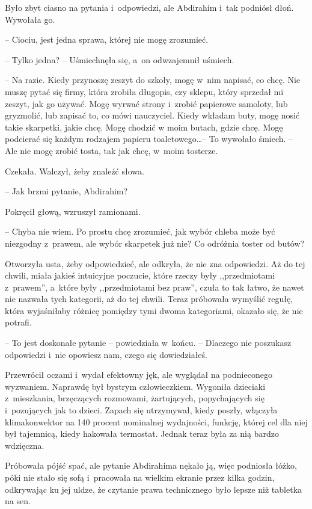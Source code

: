 \documentclass[oneside,polish,11pt,sfheadings]{mwbk}
\begin{document}
Było zbyt ciasno na pytania i~odpowiedzi, ale Abdirahim i~tak podniósł
dłoń. Wywołała go. 

-- Ciociu, jest jedna sprawa, której nie mogę
zrozumieć.

-- Tylko jedna? -- Uśmiechnęła się, a~on odwzajemnił uśmiech.

-- Na razie. Kiedy przynoszę zeszyt do szkoły, mogę w~nim napisać, co
chcę. Nie muszę pytać się firmy, która zrobiła długopis, czy sklepu,
który sprzedał mi zeszyt, jak go używać. Mogę wyrwać strony i~zrobić
papierowe samoloty, lub gryzmolić, lub zapisać to, co mówi nauczyciel.
Kiedy wkładam buty, mogę nosić takie skarpetki, jakie chcę. Mogę chodzić
w moim butach, gdzie chcę. Mogę podcierać się każdym rodzajem papieru
toaletowego\ldots  -- To wywołało śmiech. -- Ale nie mogę zrobić tosta, tak
jak chcę, w~moim tosterze.

Czekała. Walczył, żeby znaleźć słowa. 

-- Jak brzmi pytanie, Abdirahim?

Pokręcił głową, wzruszył ramionami. 

-- Chyba nie wiem. Po prostu chcę
zrozumieć, jak wybór chleba może być niezgodny z~prawem, ale wybór
skarpetek już nie? Co odróżnia toster od butów?

Otworzyła usta, żeby odpowiedzieć, ale odkryła, że nie zna odpowiedzi.
Aż do tej chwili, miała jakieś intuicyjne poczucie, które rzeczy były
,,przedmiotami z~prawem'', a~które były ,,przedmiotami bez praw'', czuła
to tak łatwo, że nawet nie nazwała tych kategorii, aż do tej chwili.
Teraz próbowała wymyślić regułę, która wyjaśniłaby różnicę pomiędzy tymi
dwoma kategoriami, okazało się, że nie potrafi.

-- To jest doskonałe pytanie -- powiedziała w~końcu. -- Dlaczego nie
poszukasz odpowiedzi i~nie opowiesz nam, czego się dowiedziałeś.

Przewrócił oczami i~wydał efektowny jęk, ale wyglądał na podnieconego
wyzwaniem. Naprawdę był bystrym człowieczkiem. Wygoniła dzieciaki z~mieszkania, brzęczących rozmowami, żartujących, popychających się i~pozujących jak to dzieci. Zapach się utrzymywał, kiedy poszły, włączyła
klimakonwektor na 140 procent nominalnej wydajności, funkcję, której cel
dla niej był tajemnicą, kiedy hakowała termostat. Jednak teraz była za
nią bardzo wdzięczna.

Próbowała pójść spać, ale pytanie Abdirahima nękało ją, więc podniosła
łóżko, póki nie stało się sofą i~pracowała na wielkim ekranie przez
kilka godzin, odkrywając ku jej uldze, że czytanie prawa technicznego
było lepsze niż tabletka na sen.
\end{document}

